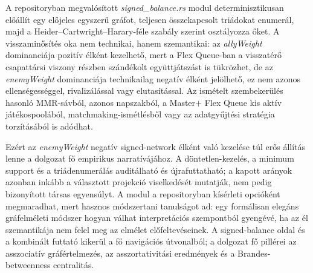 A repositoryban megvalósított \textit{signed\_balance.rs} modul determinisztikusan előállít egy előjeles egyszerű gráfot, teljesen összekapcsolt triádokat enumerál, majd a Heider--Cartwright--Harary-féle szabály szerint osztályozza őket. A visszaminősítés oka nem technikai, hanem szemantikai: az \textit{allyWeight} dominanciája pozitív élként kezelhető, mert a Flex Queue-ban a visszatérő csapattársi viszony részben szándékolt együttjátszást is tükrözhet, de az \textit{enemyWeight} dominanciája technikailag negatív élként jelölhető, ez nem azonos ellenségességgel, rivalizálással vagy elutasítással. Az ismételt szembekerülés hasonló MMR-sávból, azonos napszakból, a Master$+$ Flex Queue kis aktív játékospoolából, matchmaking-ismétlésből vagy az adatgyűjtési stratégia torzításából is adódhat.

Ezért az \textit{enemyWeight} negatív signed-network élként való kezelése túl erős állítás lenne a dolgozat fő empirikus narratívájához. A döntetlen-kezelés, a minimum support és a triádenumerálás auditálható és újrafuttatható; a kapott arányok azonban inkább a választott projekció viselkedését mutatják, nem pedig bizonyított társas egyensúlyt. A modul a repositoryban kísérleti opcióként megmaradhat, mert hasznos módszertani tanulságot ad: egy formálisan elegáns gráfelméleti módszer hogyan válhat interpretációs szempontból gyengévé, ha az él szemantikája nem felel meg az elmélet előfeltevéseinek. A signed-balance oldal és a kombinált futtató kikerül a fő navigációs útvonalból; a dolgozat fő pillérei az asszociatív gráfértelmezés, az asszortativitási eredmények és a Brandes-betweenness centralitás.
